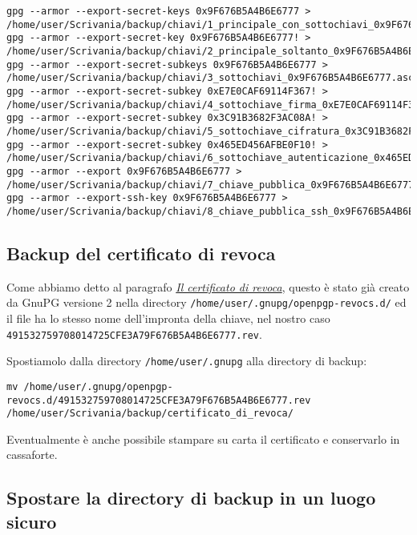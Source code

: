 \documentclass[a4paper,10pt]{article}
\begin{document}
\begin{lstlisting}
gpg --armor --export-secret-keys 0x9F676B5A4B6E6777 > /home/user/Scrivania/backup/chiavi/1_principale_con_sottochiavi_0x9F676B5A4B6E6777.asc
gpg --armor --export-secret-key 0x9F676B5A4B6E6777! > /home/user/Scrivania/backup/chiavi/2_principale_soltanto_0x9F676B5A4B6E6777.asc
gpg --armor --export-secret-subkeys 0x9F676B5A4B6E6777 > /home/user/Scrivania/backup/chiavi/3_sottochiavi_0x9F676B5A4B6E6777.asc
gpg --armor --export-secret-subkey 0xE7E0CAF69114F367! > /home/user/Scrivania/backup/chiavi/4_sottochiave_firma_0xE7E0CAF69114F367.asc
gpg --armor --export-secret-subkey 0x3C91B3682F3AC08A! > /home/user/Scrivania/backup/chiavi/5_sottochiave_cifratura_0x3C91B3682F3AC08A.asc
gpg --armor --export-secret-subkey 0x465ED456AFBE0F10! > /home/user/Scrivania/backup/chiavi/6_sottochiave_autenticazione_0x465ED456AFBE0F10.asc
gpg --armor --export 0x9F676B5A4B6E6777 > /home/user/Scrivania/backup/chiavi/7_chiave_pubblica_0x9F676B5A4B6E6777.asc
gpg --armor --export-ssh-key 0x9F676B5A4B6E6777 > /home/user/Scrivania/backup/chiavi/8_chiave_pubblica_ssh_0x9F676B5A4B6E6777.asc
\end{lstlisting}

\subsection{Backup del certificato di revoca} \label{backup-certificato-revoca}

Come abbiamo detto al paragrafo \textit{\hyperref[certificato-revoca]{Il certificato di revoca}}, questo è stato già creato da GnuPG versione 2 nella directory \texttt{/home/user/.gnupg/openpgp-revocs.d/} ed il file ha lo stesso nome dell'impronta della chiave, nel nostro caso \newline \texttt{491532759708014725CFE3A79F676B5A4B6E6777.rev}.

Spostiamolo dalla directory \texttt{/home/user/.gnupg} alla directory di backup:

\begin{lstlisting}
mv /home/user/.gnupg/openpgp-revocs.d/491532759708014725CFE3A79F676B5A4B6E6777.rev /home/user/Scrivania/backup/certificato_di_revoca/
\end{lstlisting}

Eventualmente è anche possibile stampare su carta il certificato e conservarlo in cassaforte.

\subsection{Spostare la directory di backup in un luogo sicuro}
\end{document}
